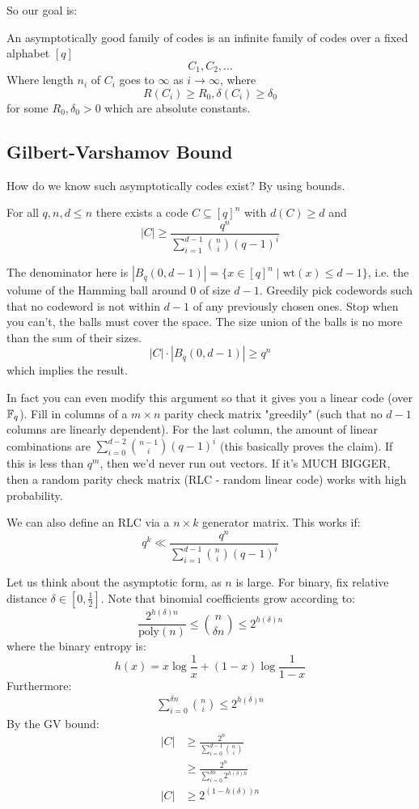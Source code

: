 So our goal is:
\begin{definition}
    An asymptotically good family of codes is an infinite family of codes over a fixed alphabet $[q]$
    \[ C_1, C_2, \dots \]
    Where length $n_i$ of $C_i$ goes to $\infty$ as $i \to \infty$, where
    \[ R(C_i) \geq R_0, \delta(C_i) \geq \delta_0 \]
    for some $R_0, \delta_0 > 0$ which are absolute constants.
\end{definition} 

\subsection{Gilbert-Varshamov Bound}
How do we know such asymptotically codes exist? By using bounds.
\begin{theorem}
    For all $q, n, d \leq n$ there exists a code $C \subseteq [q]^n$ with $d(C) \geq d$ and
    \[ |C| \geq \frac{q^n}{\sum_{i = 1}^{d - 1} \binom{n}{i} (q - 1)^i} \]
\begin{proof*}
The denominator here is $|B_q(0, d - 1)| = \{x \in [q]^n \mid \text{wt}(x) \leq d - 1\}$,
i.e. the volume of the Hamming ball around 0 of size $d - 1$.
Greedily pick codewords such that no codeword is not within $d - 1$ of any previously chosen ones. Stop when you can't, the balls must cover the space. The size union of the balls is no more than the sum of their sizes.
\[ |C| \cdot |B_q(0, d - 1)| \geq q^n \]
which implies the result.
\end{proof*}
\end{theorem}

In fact you can even modify this argument so that it gives you a linear code (over $\operatorname{\mathbb{F}}_q$). Fill in columns of a $m \times n$ parity check matrix "greedily" (such that no $d - 1$ columns are linearly dependent). For the last column,
the amount of linear combinations are $\sum^{d - 2}_{i = 0} \binom{n - 1}{i} (q - 1)^i$ (this basically proves the claim). If this is less than $q^m$, then we'd never run out vectors. 
If it's MUCH BIGGER, then a random parity check matrix (RLC - random linear code) works with high probability.

We can also define an RLC via a $n \times k$ generator matrix. This works if:
\[ q^k \ll \frac{q^n}{\sum_{i = 1}^{d - 1} \binom{n}{i} (q - 1)^i} \]

Let us think about the asymptotic form, as $n$ is large.
For binary, fix relative distance $\delta \in [0, \frac{1}{2}]$. Note that binomial coefficients grow according to:
\[ \frac{2^{h(\delta) n}}{\text{poly}(n)} \leq \binom{n}{\delta n} \leq 2^{h(\delta) n}\]
where the binary entropy is:
\[ h(x) = x \log \frac{1}{x} + (1 - x) \log \frac{1}{1 - x} \]
Furthermore:
\begin{align*}
    \sum_{i = 0}^{\delta n} \binom{n}{i} \leq 2^{h(\delta) n}
\end{align*}
By the GV bound:
\begin{align*}
    |C| &\geq \frac{2^n}{\sum_{i = 0}^{d - 1} \binom{n}{i}} \\
    &\geq \frac{2^n}{\sum_{i = 0}^{\delta n} 2^{h(\delta) n}} \\
    |C| &\geq 2^{(1 - h(\delta))n}
\end{align*}

